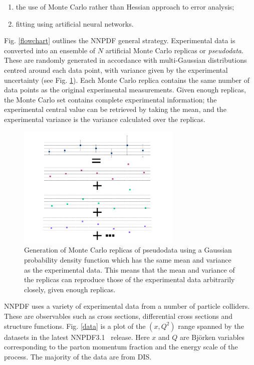 \begin{enumerate}
\item  the use of Monte Carlo rather than Hessian approach to error analysis;
    \item  fitting using artificial neural networks.
\end{enumerate}

Fig. \ref{flowchart} outlines the NNPDF general strategy. Experimental data is converted into an ensemble of $N$ artificial Monte Carlo replicas or \textit{pseudodata}. These are randomly generated in accordance with multi-Gaussian distributions centred around each data point, with variance given by the experimental uncertainty (see Fig. \ref{MC}). Each Monte Carlo replica contains the same number of data points as the original experimental measurements. Given enough replicas, the Monte Carlo set contains complete experimental information; the experimental central value can be retrieved by taking the mean, and the experimental variance is the variance calculated over the replicas. 

\begin{figure}
\centering
\includegraphics[width=0.7\textwidth]{background/monte_carlo.pdf}
\caption{Generation of Monte Carlo replicas of pseudodata using a Gaussian probability density
  function which has the same mean and variance as the experimental data. This means that the
  mean and variance of the replicas can reproduce those of the experimental data arbitrarily
  closely, given enough replicas.}
\label{MC}
\end{figure}


NNPDF uses a variety of experimental data from a number of particle colliders. These are observables such as cross sections, differential cross sections and structure functions. Fig. \ref{data} is a plot of the $(x,Q^2)$ range spanned by the datasets in the latest NNPDF3.1~\cite{Ball:2017nwa} release. Here $x$ and $Q$ are Bj\"orken variables corresponding to the parton momentum fraction and the energy scale of the process. The majority of the data are from DIS.

